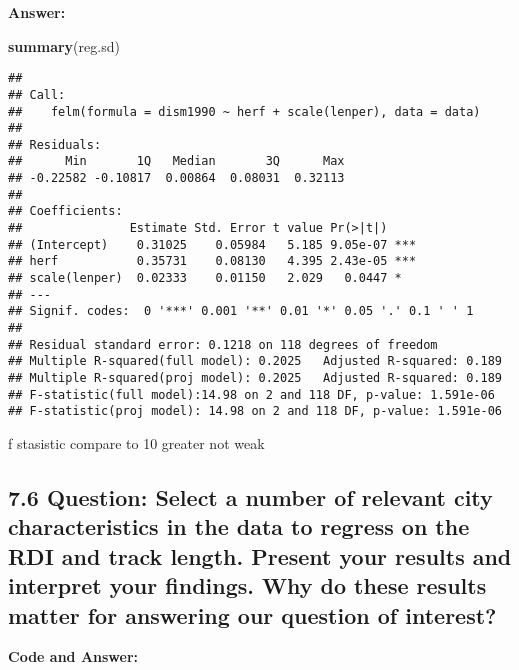 \documentclass[
]{article}
\newenvironment{Shaded}{\begin{snugshade}}{\end{snugshade}}
\newcommand{\FunctionTok}[1]{\textcolor[rgb]{0.13,0.29,0.53}{\textbf{#1}}}
\newcommand{\NormalTok}[1]{#1}
\begin{document}
\textbf{Answer:}

\begin{Shaded}
\begin{Highlighting}[]
\FunctionTok{summary}\NormalTok{(reg.sd)}
\end{Highlighting}
\end{Shaded}

\begin{verbatim}
## 
## Call:
##    felm(formula = dism1990 ~ herf + scale(lenper), data = data) 
## 
## Residuals:
##      Min       1Q   Median       3Q      Max 
## -0.22582 -0.10817  0.00864  0.08031  0.32113 
## 
## Coefficients:
##               Estimate Std. Error t value Pr(>|t|)    
## (Intercept)    0.31025    0.05984   5.185 9.05e-07 ***
## herf           0.35731    0.08130   4.395 2.43e-05 ***
## scale(lenper)  0.02333    0.01150   2.029   0.0447 *  
## ---
## Signif. codes:  0 '***' 0.001 '**' 0.01 '*' 0.05 '.' 0.1 ' ' 1
## 
## Residual standard error: 0.1218 on 118 degrees of freedom
## Multiple R-squared(full model): 0.2025   Adjusted R-squared: 0.189 
## Multiple R-squared(proj model): 0.2025   Adjusted R-squared: 0.189 
## F-statistic(full model):14.98 on 2 and 118 DF, p-value: 1.591e-06 
## F-statistic(proj model): 14.98 on 2 and 118 DF, p-value: 1.591e-06
\end{verbatim}

f stasistic compare to 10 greater not weak

\clearpage

\hypertarget{question-select-a-number-of-relevant-city-characteristics-in-the-data-to-regress-on-the-rdi-and-track-length.-present-your-results-and-interpret-your-findings.-why-do-these-results-matter-for-answering-our-question-of-interest}{%
\subsection{7.6 Question: Select a number of relevant city
characteristics in the data to regress on the RDI and track length.
Present your results and interpret your findings. Why do these results
matter for answering our question of
interest?}\label{question-select-a-number-of-relevant-city-characteristics-in-the-data-to-regress-on-the-rdi-and-track-length.-present-your-results-and-interpret-your-findings.-why-do-these-results-matter-for-answering-our-question-of-interest}}

\textbf{Code and Answer:}
\end{document}

